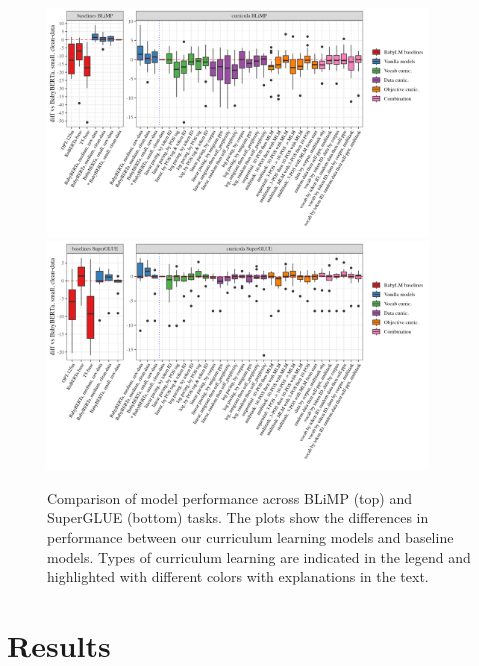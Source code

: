 \begin{figure}[htbp]
    \centering
    \includegraphics[width=0.9\textwidth]{chapters/climb/figures/babylm_blimp_diffs_boxplots.png}
    \vspace{1em}  %
    \includegraphics[width=0.9\textwidth]{chapters/climb/figures/babylm_superglue_diffs_boxplots.png}
    \caption{Comparison of model performance across BLiMP (top) and SuperGLUE (bottom) tasks. The plots show the differences in performance between our curriculum learning models and baseline models. Types of curriculum learning are indicated in the legend and highlighted with different colors with explanations in the text.}
    \label{fig:combined-boxplots}
\end{figure}


\section{Results}

